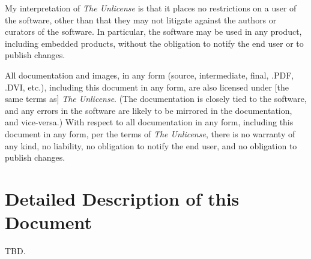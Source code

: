 My interpretation of \emph{The Unlicense} is that it places no restrictions
on a user of the software, other than that they may not litigate against
the authors or curators of the software.  In particular, the software may
be used in any product, including embedded products, without the obligation
to notify the end user or to publish changes.

All documentation and images, in any form (source, intermediate, final, .PDF,
.DVI, etc.), including this document in any form, are also licensed under [the same
terms as] \emph{The Unlicense}. (The documentation is closely tied to the software,
and any errors in the software are likely to be mirrored in the documentation,
and vice-versa.)  With respect to all documentation in any form, including this
document in any form, per the
terms of \emph{The Unlicense}, there is no warranty of any kind, no liability,
no obligation to notify the end user, and
no obligation to publish changes.


\section{Detailed Description of this Document}
\label{ciov0:sotd0}

TBD.


